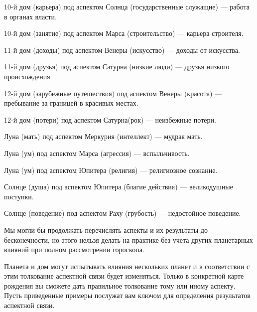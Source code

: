 \begin{myitem}
	\item 10-й дом (карьера) под аспектом Солнца (государственные служащие) --- работа в органах власти.
	\item 10-й дом (занятие) под аспектом Марса (строительство) --- карьера строителя.
	\item 11-й дом (доходы) под аспектом Венеры (искусство) --- доходы от искусства.
	\item 11-й дом (друзья) под аспектом Сатурна (низкие люди) --- друзья низкого происхождения.
	\item 12-й дом (зарубежные путешествия) под аспектом Венеры (красота) --- пребывание за границей в красивых местах.
	\item 12-й дом (потери) под аспектом Сатурна(рок) --- неизбежные потери.
	\item Луна (мать) под аспектом Меркурия (интеллект) --- мудрая мать.
	\item Луна (ум) под аспектом Марса (агрессия) --- вспыльчивость.
	\item Луна (ум) под аспектом Юпитера (религия) --- религиозное сознание.
	\item Солнце (душа) под аспектом Юпитера (благие действия) --- великодушные поступки.
	\item Солнце (поведение) под аспектом Раху (грубость) --- недостойное поведение.
\end{myitem}

Мы могли бы продолжать перечислять аспекты и их результаты до бесконечности, но этого нельзя делать на практике без учета других планетарных влияний при полном рассмотрении гороскопа.

Планета и дом могут испытывать влияния нескольких планет и в соответствии с этим толкование аспектной связи будет изменяться. Только в конкретной карте рождения вы сможете дать правильное толкование тому или иному аспекту. Пусть приведенные примеры послужат вам ключом для определения результатов аспектной связи.
